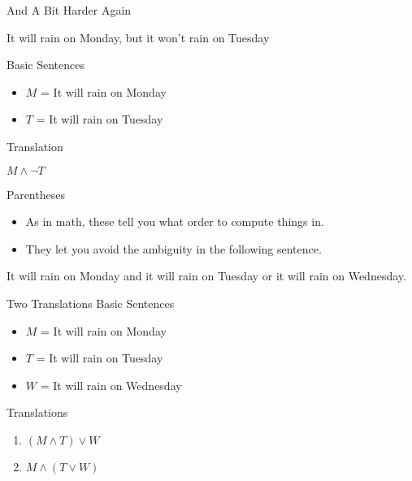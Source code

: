\documentclass[
  ignorenonframetext,
]{beamer}
\providecommand{\tightlist}{%
  \setlength{\itemsep}{0pt}\setlength{\parskip}{0pt}}
\renewcommand{\,}{\text{, }}
\renewenvironment*{quote}	
	{\list{}{\rightmargin   \leftmargin} \item } 	
	{\endlist }
\begin{document}
\begin{frame}{And A Bit Harder Again}
\protect\hypertarget{and-a-bit-harder-again}{}
\begin{quote}
It will rain on Monday, but it won't rain on Tuesday
\end{quote}

Basic Sentences

\begin{itemize}
\tightlist
\item
  \(M\) = It will rain on Monday
\item
  \(T\) = It will rain on Tuesday
\end{itemize}

Translation

\begin{quote}
\(M \wedge \neg T\)
\end{quote}
\end{frame}

\begin{frame}{Parentheses}
\protect\hypertarget{parentheses}{}
\begin{itemize}
\tightlist
\item
  As in math, these tell you what order to compute things in.
\item
  They let you avoid the ambiguity in the following sentence.
\end{itemize}

\begin{quote}
It will rain on Monday and it will rain on Tuesday or it will rain on
Wednesday.
\end{quote}
\end{frame}

\begin{frame}{Two Translations}
\protect\hypertarget{two-translations}{}
Basic Sentences

\begin{itemize}
\tightlist
\item
  \(M\) = It will rain on Monday
\item
  \(T\) = It will rain on Tuesday
\item
  \(W\) = It will rain on Wednesday
\end{itemize}

Translations

\begin{enumerate}
\tightlist
\item
  \((M \wedge T) \vee W\)
\item
  \(M \wedge (T \vee W)\)
\end{enumerate}
\end{frame}
\end{document}
